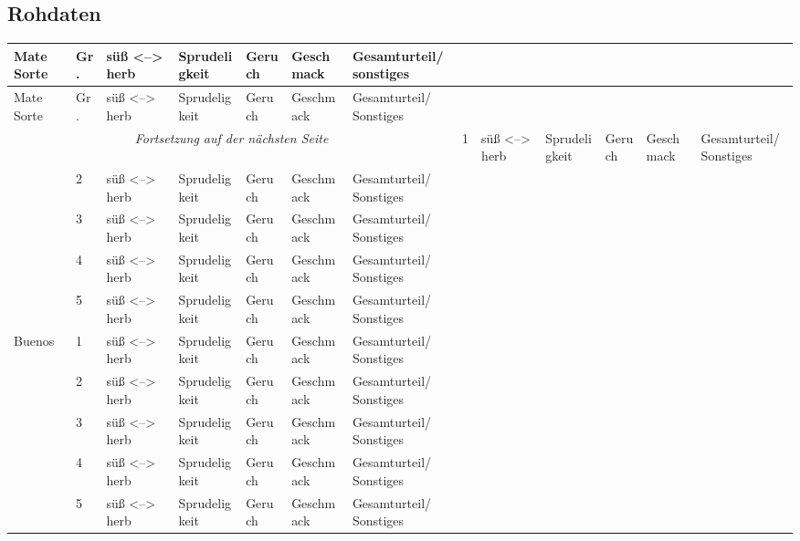 \documentclass[11pt,a4paper,ngerman]{article}
\begin{document}
\begin{landscape} 
\appendix
\section{Rohdaten}\label{sec:Rohdaten}

\begin{longtable}{|l|l||p{3cm}|p{3cm}|p{3cm}|p{3cm}|p{3cm}|} 
	\hline
	Mate Sorte & Gr. & süß <--> herb & Sprudeligkeit & Geruch & Geschmack & Gesamturteil/ sonstiges\\
	\hline\hline
  \endhead 
	\hline
	Mate Sorte & Gr. & süß <--> herb & Sprudeligkeit & Geruch & Geschmack & Gesamturteil/ Sonstiges\\
	\hline\hline
  \endfirsthead
  \multicolumn{7}{c}{\textit{Fortsetzung auf der nächsten Seite}}
  \endfoot
  \endlastfoot

 \multirow{5}{*}{BioZisch} & 1 & süß <--> herb & Sprudeligkeit & Geruch & Geschmack & Gesamturteil/ Sonstiges\\
\cline{2-7}
 & 2 & süß <--> herb & Sprudeligkeit & Geruch & Geschmack & Gesamturteil/ Sonstiges\\
\cline{2-7}
 & 3 & süß <--> herb & Sprudeligkeit & Geruch & Geschmack & Gesamturteil/ Sonstiges\\
\cline{2-7}
 & 4 & süß <--> herb & Sprudeligkeit & Geruch & Geschmack & Gesamturteil/ Sonstiges\\
\cline{2-7}
 & 5 & süß <--> herb & Sprudeligkeit & Geruch & Geschmack & Gesamturteil/ Sonstiges\\
\hline\hline

 \multirow{5}{*}{Buenos} & 1 & süß <--> herb & Sprudeligkeit & Geruch & Geschmack & Gesamturteil/ Sonstiges\\
\cline{2-7}
 & 2 & süß <--> herb & Sprudeligkeit & Geruch & Geschmack & Gesamturteil/ Sonstiges\\
\cline{2-7}
 & 3 & süß <--> herb & Sprudeligkeit & Geruch & Geschmack & Gesamturteil/ Sonstiges\\
\cline{2-7}
 & 4 & süß <--> herb & Sprudeligkeit & Geruch & Geschmack & Gesamturteil/ Sonstiges\\
\cline{2-7}
 & 5 & süß <--> herb & Sprudeligkeit & Geruch & Geschmack & Gesamturteil/ Sonstiges\\
\hline\hline
\end{longtable}


\end{landscape}
\end{document}
